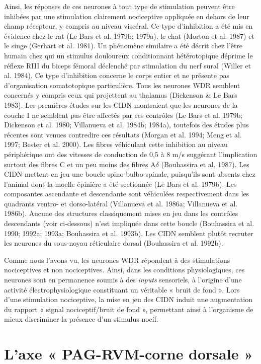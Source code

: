 \documentclass[a4paper,12pt,twoside]{report}
\begin{document}
Ainsi, les réponses de ces neurones à tout type de stimulation peuvent être inhibées par une stimulation clairement nociceptive appliquée en dehors de leur champ récepteur, y compris au niveau viscéral. Ce type d’inhibition a été mis en évidence chez le rat (Le Bars et al. 1979b; 1979a), le chat (Morton et al. 1987) et le singe (Gerhart et al. 1981). Un phénomène similaire a été décrit chez l’être humain chez qui un stimulus douloureux conditionnant hétérotopique déprime le réflexe RIII du biceps fémoral déclenché par stimulation du nerf sural (Willer et al. 1984). Ce type d’inhibition concerne le corps entier et ne présente pas d’organisation somatotopique particulière. Tous les neurones WDR semblent concernés y compris ceux qui projettent au thalamus (Dickenson \& Le Bars 1983). Les premières études sur les CIDN montraient que les neurones de la couche I ne semblent pas être affectés par ces contrôles (Le Bars et al. 1979b; Dickenson et al. 1980; Villanueva et al. 1984b; 1984a), toutefois des études plus récentes sont venues contredire ces résultats (Morgan et al. 1994; Meng et al. 1997; Bester et al. 2000). Les fibres véhiculant cette inhibition au niveau périphérique ont des vitesses de conduction de 0,5 à 8 m/s suggérant l’implication surtout des fibres C et un peu moins des fibres A$\delta$ (Bouhassira et al. 1987). Les CIDN mettent en jeu une boucle spino-bulbo-spinale, puisqu’ils sont absents chez l’animal dont la moelle épinière a été sectionnée (Le Bars et al. 1979b). Les composantes ascendante et descendante sont véhiculées respectivement dans les quadrants ventro- et dorso-latéral (Villanueva et al. 1986a; Villanueva et al. 1986b). Aucune des structures classiquement mises en jeu dans les contrôles descendants (voir ci-dessous) n’est impliquée dans cette boucle (Bouhassira et al. 1990; 1992a; 1993a; Bouhassira et al. 1993b). Les CIDN semblent plutôt recruter les neurones du sous-noyau réticulaire dorsal (Bouhassira et al. 1992b).

Comme nous l’avons vu, les neurones WDR répondent à des stimulations nociceptives et non nociceptives. Ainsi, dans les conditions physiologiques, ces neurones sont en permanence soumis à des \textit{inputs} sensoriels, à l’origine d’une activité électrophysiologique constituant un véritable « bruit de fond ». Lors d’une stimulation nociceptive, la mise en jeu des CIDN induit une augmentation du rapport « signal nociceptif/bruit de fond », permettant ainsi à l’organisme de mieux discriminer la présence d’un stimulus nocif. 

\section{L’axe « PAG-RVM-corne dorsale »}
\end{document}
